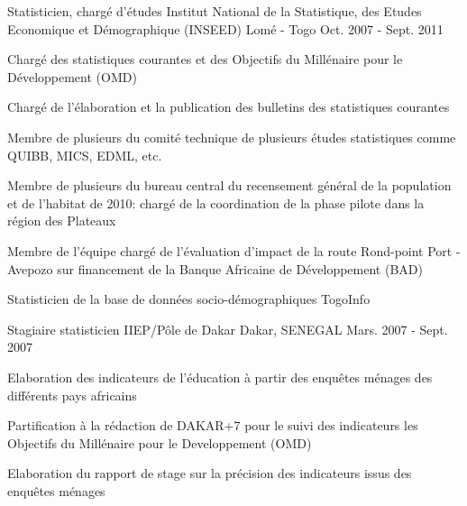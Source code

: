 \begin{cventries}
  \cventry
    {Statisticien, chargé d'études} %
    {Institut National de la Statistique, des Etudes Economique et Démographique (INSEED)} %
    {Lomé - Togo} %
    {Oct. 2007 - Sept. 2011} %
    {
      \begin{cvitems} %
        \item {Chargé des statistiques courantes et des Objectifs du Millénaire pour le Développement (OMD)}
        \item {Chargé de l'élaboration et la publication des bulletins des statistiques courantes}
        \item {Membre de plusieurs du comité technique de plusieurs études statistiques comme QUIBB, MICS, EDML, etc.}
        \item {Membre de plusieurs du bureau central du recensement général de la population et de l'habitat de 2010: chargé de la coordination de la phase pilote dans la région des Plateaux}
        \item {Membre de l'équipe chargé de l'évaluation d'impact de la route Rond-point Port - Avepozo sur financement de la Banque Africaine de Développement (BAD)}
        \item {Statisticien de la base de données socio-démographiques TogoInfo}
      \end{cvitems}
    }

  \cventry
    {Stagiaire statisticien} %
    {IIEP/Pôle de Dakar} %
    {Dakar, SENEGAL} %
    {Mars. 2007 - Sept. 2007 } %
    {
      \begin{cvitems} %
        \item {Elaboration des indicateurs de l'éducation à partir des enquêtes ménages des différents pays africains}
        \item {Partification à la rédaction de DAKAR+7 pour le suivi des indicateurs les Objectifs du Millénaire pour le Developpement (OMD)}
        \item {Elaboration du rapport de stage sur la précision des indicateurs issus des enquêtes ménages}
      \end{cvitems}
    }

\end{cventries}

